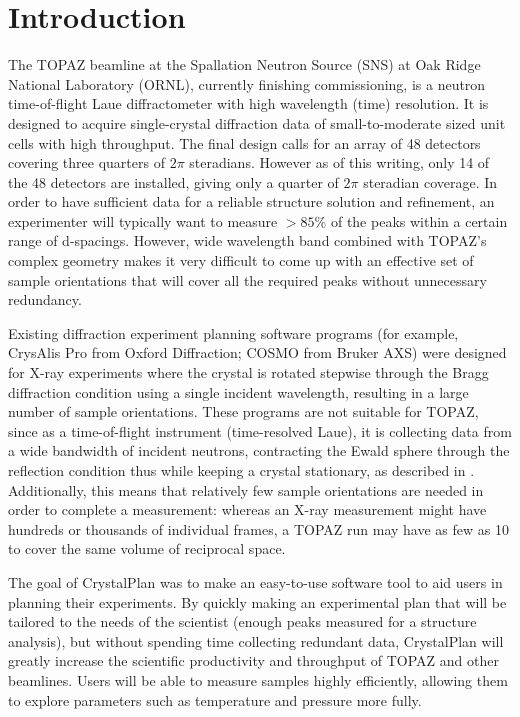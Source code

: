 \documentclass[final]{iucr}              %
\begin{document}
\section{Introduction}

The TOPAZ beamline at the Spallation Neutron Source (SNS) at Oak Ridge National
Laboratory (ORNL), currently finishing commissioning, is a neutron
time-of-flight Laue diffractometer with high wavelength (time) resolution. It
is designed to acquire single-crystal diffraction data of small-to-moderate sized unit cells with  high
throughput. The final design calls for an array of 48 detectors covering three
quarters of $2\pi$ steradians. However as of this writing, only 14 of the 48
detectors are installed, giving only a quarter of $2\pi$ steradian coverage. In
order to have sufficient data for a reliable structure solution and
refinement, an experimenter will typically want to measure $ > 85\%$ of the
peaks within a certain range of d-spacings. However, wide wavelength band
combined with TOPAZ's complex geometry makes it very difficult to come up with
an effective set of sample orientations that will cover all the required peaks
without unnecessary redundancy.   


Existing diffraction experiment planning software programs (for example,
CrysAlis Pro from Oxford Diffraction; COSMO from Bruker AXS) were designed for
X-ray experiments where the crystal is rotated stepwise through the Bragg
diffraction condition using a single incident wavelength, 
resulting in a large number of sample orientations.
These programs are not suitable for TOPAZ, since as a time-of-flight instrument
(time-resolved Laue), it is collecting data from a wide
bandwidth of incident neutrons, contracting the Ewald sphere through the
reflection condition thus while keeping a crystal stationary, as described in
\cite{Schultz94,Wilson00}.
 Additionally, this means that relatively few sample
orientations are needed in order to complete a measurement: whereas an X-ray measurement might have
hundreds or thousands of individual frames, a TOPAZ run may have as few as 10
to cover the same volume of reciprocal space.


The goal of CrystalPlan was to make an easy-to-use software tool to aid users in
planning their experiments. By quickly making an experimental plan that will be
tailored to the needs of the scientist (enough peaks measured for a structure
analysis), but without spending time collecting redundant data, CrystalPlan will
greatly increase the scientific productivity and throughput of TOPAZ and other
beamlines. Users will be able to measure samples highly efficiently, allowing
them to explore parameters such as temperature and pressure more fully.
 
\end{document}
